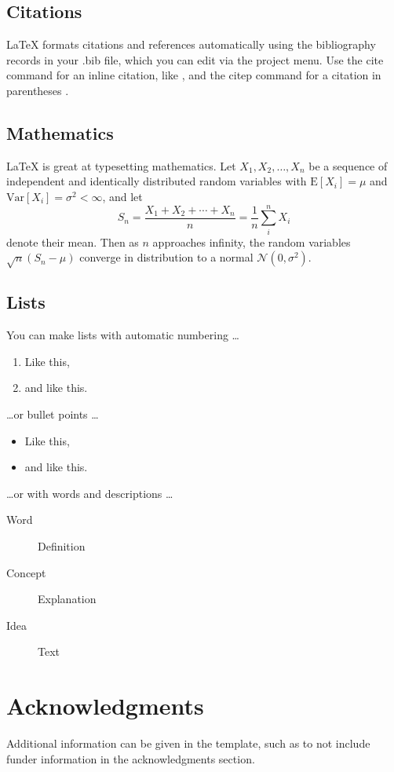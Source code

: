 \documentclass[fleqn,10pt]{olplainarticle}
\begin{document}
	\subsection*{Citations}
	
	LaTeX formats citations and references automatically using the bibliography records in your .bib file, which you can edit via the project menu. Use the cite command for an inline citation, like \cite{lees2010theoretical}, and the citep command for a citation in parentheses \citep{lees2010theoretical}.
	
	\subsection*{Mathematics}
	
	\LaTeX{} is great at typesetting mathematics. Let $X_1, X_2, \ldots, X_n$ be a sequence of independent and identically distributed random variables with $\text{E}[X_i] = \mu$ and $\text{Var}[X_i] = \sigma^2 < \infty$, and let
	$$S_n = \frac{X_1 + X_2 + \cdots + X_n}{n}
	= \frac{1}{n}\sum_{i}^{n} X_i$$
	denote their mean. Then as $n$ approaches infinity, the random variables $\sqrt{n}(S_n - \mu)$ converge in distribution to a normal $\mathcal{N}(0, \sigma^2)$.
	
	\subsection*{Lists}
	
	You can make lists with automatic numbering \dots
	
	\begin{enumerate}[noitemsep] 
		\item Like this,
		\item and like this.
	\end{enumerate}
	\dots or bullet points \dots
	\begin{itemize}[noitemsep] 
		\item Like this,
		\item and like this.
	\end{itemize}
	\dots or with words and descriptions \dots
	\begin{description}
		\item[Word] Definition
		\item[Concept] Explanation
		\item[Idea] Text
	\end{description}
	
	\section*{Acknowledgments}
	
	Additional information can be given in the template, such as to not include funder information in the acknowledgments section.
	
	
	
\end{document}
